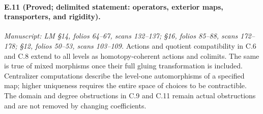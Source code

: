 \paragraph{E.11 (Proved; delimited statement: operators, exterior maps, transporters, and rigidity).}
\textit{Manuscript: LM \S14, folios 64--67, scans 132--137; \S16, folios 85--88, scans 172--178; \S12, folios 50--53, scans 103--109.}
Actions and quotient compatibility in C.6 and C.8 extend to all levels as homotopy-coherent actions and colimits. The same is true of mixed morphisms once their full gluing transformation is included. Centralizer computations describe the level-one automorphisms of a specified map; higher uniqueness requires the entire space of choices to be contractible. The domain and degree obstructions in C.9 and C.11 remain actual obstructions and are not removed by changing coefficients.
